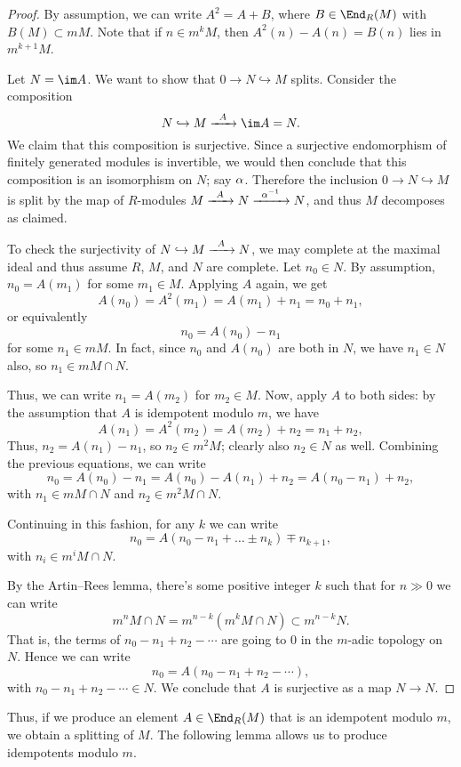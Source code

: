 \documentclass[12pt]{article}
\let\inc\hookrightarrow
\theoremstyle{theorem}
\numberwithin{thm}{section}
\theoremstyle{definition}
\begin{document}
\begin{proof}
  By assumption, we can write $A^2 = A + B$, where $B\in\End_R(M)$ with $B(M)\subset mM$.
  Note that if $n \in m^kM$, then $A^2(n) - A(n) = B(n)$ lies in $m^{k+1}M$.

  Let $N = \im A$. We want to show that $0 \to N\inc M$ splits. Consider the composition
  \[ N\inc M \xra{A} \im A = N.\]
  We claim that this composition is surjective. Since a surjective endomorphism of finitely generated modules is invertible, we would then conclude that this composition is an isomorphism on $N$; say $\alpha$.
  Therefore the inclusion \( 0 \to N \inc M \) is split by the map of $R$-modules $M\xra{A} N\xra{\a\inv} N$, and thus $M$ decomposes as claimed.

  To check the surjectivity of $N\inc M \xra{A} N$,  we may complete at the maximal ideal and thus assume $R$, $M$, and $N$ are complete. Let $n_0\in N$. By assumption, $n_0=A(m_1)$ for some $m_1\in M$. Applying $A$ again, we get
  \[ A(n_0) = A^2(m_1) = A(m_1) + n_1 = n_0 + n_1, \]
  or equivalently
  \[ n_0 = A(n_0) - n_1 \]
  for some $n_1\in mM$. In fact, since $n_0$ and $A(n_0)$ are both in $N$, we have $n_1\in N$ also, so $n_1\in mM\cap N$.

  Thus, we can write $n_1 = A(m_2)$ for $m_2\in M$.
  Now, apply $A$ to both sides: by the assumption that $A$ is idempotent modulo $m$, we have
  \[ A(n_1)=A^2(m_2) = A(m_2) + n_2 = n_1+n_2, \]
  Thus, $n_2=A(n_1)-n_1$, so $n_2\in m^2M$; clearly also $n_2\in N$ as well.
  Combining the previous equations, we can write
  \[ n_0 = A(n_0) - n_1 = A(n_0) - A(n_1) + n_2 = A(n_0 - n_1) + n_2, \]
  with $n_1\in mM\cap N$ and $n_2\in m^2M\cap N$.

  Continuing in this fashion, for any $k$ we can write
  \[ n_0=A(n_0-n_1+\dots \pm n_k) \mp n_{k+1}, \]
  with $n_i \in m^i M\cap N$.

  By the Artin--Rees lemma, there's some positive integer $k$ such that for $n\gg0$ we can write
  \[ m^n M\cap N = m^{n-k} ( m^kM\cap N)\subset m^{n-k} N. \]
  That is, the terms of $n_0-n_1+n_2-\cdots$ are going to 0 in the $m$-adic topology on $N$. Hence we can write
  \[ n_0=A(n_0-n_1+n_2-\cdots), \]
  with $n_0-n_1+n_2-\cdots\in N$. We conclude that $A$ is surjective as a map $N\to N$.
\end{proof}

Thus, if we produce an element $A\in \End_R(M)$ that is an idempotent modulo $m$, we obtain a splitting of $M$.
The following lemma allows us to produce idempotents modulo $m$.
\end{document}
